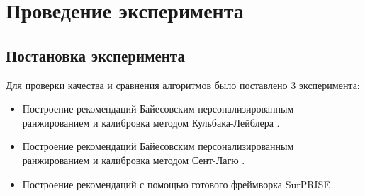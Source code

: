 \section{Проведение эксперимента}
\subsection{Постановка эксперимента}
Для проверки качества и сравнения алгоритмов было поставлено 3 эксперимента:
\begin{itemize}
   \item Построение рекомендаций Байесовским
   персонализированным ранжированием и калибровка методом Кульбака-Лейблера \cite{bib4}.
   \item Построение рекомендаций Байесовским
   персонализированным ранжированием и калибровка методом Сент-Лагю \cite{bib5}.
   \item Построение рекомендаций с помощью готового фреймворка SurPRISE \cite{sur}.
\end{itemize}
